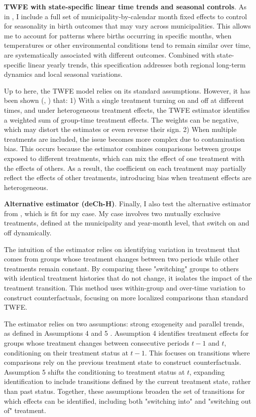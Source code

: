 \documentclass[12pt, oneside]{article}      %
\begin{document}
\textbf{TWFE with state-specific linear time trends and seasonal controls}. As in \cite{Cohen2022}, I include a full set of municipality-by-calendar month fixed effects to control for seasonality in birth outcomes that may vary across municipalities. This allows me to account for patterns where births occurring in specific months, when temperatures or other environmental conditions tend to remain similar over time, are systematically associated with different outcomes. Combined with state-specific linear yearly trends, this specification addresses both regional long-term dynamics and local seasonal variations.

Up to here, the TWFE model relies on its standard assumptions. However, it has been shown (\cite{deChaisemartin2020}, \cite{deChaisemartin2023}) that: 1) With a single treatment turning on and off at different times, and under heterogeneous treatment effects, the TWFE estimator identifies a weighted sum of group-time treatment effects. The weights can be negative, which may distort the estimates or even reverse their sign. 2) When multiple treatments are included, the issue becomes more complex due to contamination bias. This occurs because the estimator combines comparisons between groups exposed to different treatments, which can mix the effect of one treatment with the effects of others. As a result, the coefficient on each treatment may partially reflect the effects of other treatments, introducing bias when treatment effects are heterogeneous.


\textbf{Alternative estimator (deCh-H)}. Finally, I also test the alternative estimator from \cite{deChaisemartin2023}, which is fit for my case. My case involves two mutually exclusive treatments, defined at the municipality and year-month level, that switch on and off dynamically.

The intuition of the estimator relies on identifying variation in treatment that comes from groups whose treatment changes between two periods while other treatments remain constant. By comparing these "switching" groups to others with identical treatment histories that do not change, it isolates the impact of the treatment transition. This method uses within-group and over-time variation to construct counterfactuals, focusing on more localized comparisons than standard TWFE.

The estimator relies on two assumptions: strong exogeneity and parallel trends, as defined in Assumptions 4 and 5 \cite{deChaisemartin2023}. Assumption 4 identifies treatment effects for groups whose treatment changes between consecutive periods $t-1$ and $t$, conditioning on their treatment status at $t-1$. This focuses on transitions where comparisons rely on the previous treatment state to construct counterfactuals. Assumption 5 shifts the conditioning to treatment status at $t$, expanding identification to include transitions defined by the current treatment state, rather than past status. Together, these assumptions broaden the set of transitions for which effects can be identified, including both "switching into" and "switching out of" treatment.
\end{document}
